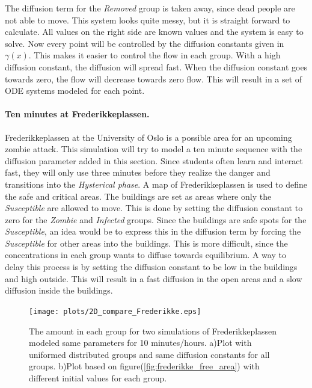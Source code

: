 \documentclass[%
twoside,                 %
final,                   %
10pt]{article}
\begin{document}
The diffusion term for the \emph{Removed} group is taken away, since dead people are not able to move. This system looks quite messy, but it is straight forward to calculate. All values on the right side are known values and the system is easy to solve. Now every point will be controlled by the diffusion constants given in $\gamma(x)$. This makes it easier to control the flow in each group. With a high diffusion constant, the diffusion will spread fast. When the diffusion constant goes towards zero, the flow will decrease towards zero flow. This will result in a set of ODE systems modeled for each point.

\paragraph{Ten minutes at Frederikkeplassen.}
Frederikkeplassen at the University of Oslo is a possible area for an upcoming zombie attack. This simulation will try to model a ten minute sequence with the diffusion parameter added in this section. Since students often learn and interact fast, they will only use three minutes before they realize the danger and transitions into the \emph{Hysterical phase}. A map of Frederikkeplassen is used to define the safe and critical areas. The buildings are set as areas where only the \emph{Susceptible} are allowed to move. This is done by setting the diffusion constant to zero for the \emph{Zombie} and \emph{Infected} groups. Since the buildings are safe spots for the \emph{Susceptible}, an idea would be to express this in the diffusion term by forcing the \emph{Susceptible} for other areas into the buildings. This is more difficult, since the concentrations in each group wants to diffuse towards equilibrium. A way to delay this process is by setting the diffusion constant to be low in the buildings and high outside. This will result in a fast diffusion in the open areas and a slow diffusion inside the buildings. 


\begin{figure}[ht]
  \centerline{\texttt{[image: plots/2D\_compare\_Frederikke.eps]}}
  \caption{
  \label{fig:frederikke_numbers} The amount in each group for two simulations of Frederikkeplassen modeled same parameters for 10 minutes/hours. a)Plot with uniformed distributed groups and same diffusion constants for all groups. b)Plot based on figure(\ref{fig:frederikke_free_area}) with different initial values for each group.
  }
\end{figure}
\end{document}
